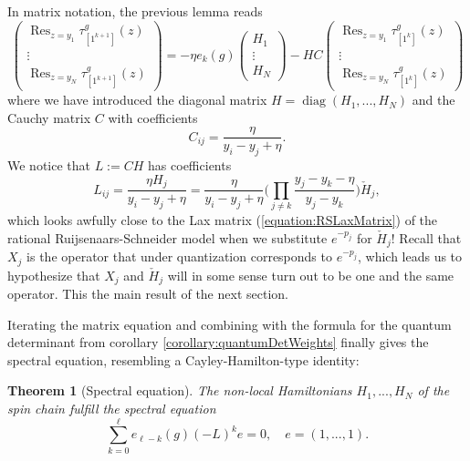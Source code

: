 \documentclass[11pt]{report}
\newtheorem{theorem}{Theorem}[section]
\theoremstyle{definition}
\theoremstyle{remark}
\theoremstyle{remark}
\begin{document}
In matrix notation, the previous lemma reads
\begin{equation*}
\begin{pmatrix}
\operatorname{Res}_{z=y_1} \tau_{[1^{k+1}]}^g(z) \\
\vdots \\
\operatorname{Res}_{z=y_N} \tau_{[1^{k+1}]}^g(z)
\end{pmatrix}
=
-\eta e_k(g)
\begin{pmatrix}
H_1 \\
\vdots \\
H_N
\end{pmatrix}
- HC
\begin{pmatrix}
\operatorname{Res}_{z=y_1} \tau_{[1^k]}^g(z) \\
\vdots \\
\operatorname{Res}_{z=y_N} \tau_{[1^k]}^g(z)
\end{pmatrix}
\end{equation*}
where we have introduced the diagonal matrix $H = \operatorname{diag}(H_1,...,H_N)$ and the Cauchy matrix $C$ with coefficients
\begin{equation*}
C_{ij} = \frac{\eta}{y_i-y_j+\eta}.
\end{equation*}
We notice that $L := CH$ has coefficients
\begin{equation*}
L_{ij} = \frac{\eta H_j}{y_i-y_j+\eta} = \frac{\eta}{y_i-y_j+\eta} \bigg( \prod_{j \neq k} \frac{y_j-y_k-\eta}{y_j-y_k} \bigg) \check H_j,
\end{equation*}
which looks awfully close to the Lax matrix (\ref{equation:RSLaxMatrix}) of the rational Ruijsenaars-Schneider model when we substitute $e^{-p_j}$ for $\check H_j$! Recall that $X_j$ is the operator that under quantization corresponds to $e^{-p_j}$, which leads us to hypothesize that $X_j$ and $\check H_j$ will in some sense turn out to be one and the same operator. This the main result of the next section.

Iterating the matrix equation and combining with the formula for the quantum determinant from corollary \ref{corollary:quantumDetWeights} finally gives the spectral equation, resembling a Cayley-Hamilton-type identity:

\begin{theorem}[Spectral equation]\label{theorem:spectralEq}
The non-local Hamiltonians $H_1,...,H_N$ of the spin chain fulfill the \emph{spectral equation}
\begin{equation}\label{equation:spectralEq}
\sum_{k=0}^\ell e_{\ell-k}(g) (-L)^k e = 0, \quad e = (1,...,1).
\end{equation}
\end{theorem}
\end{document}
